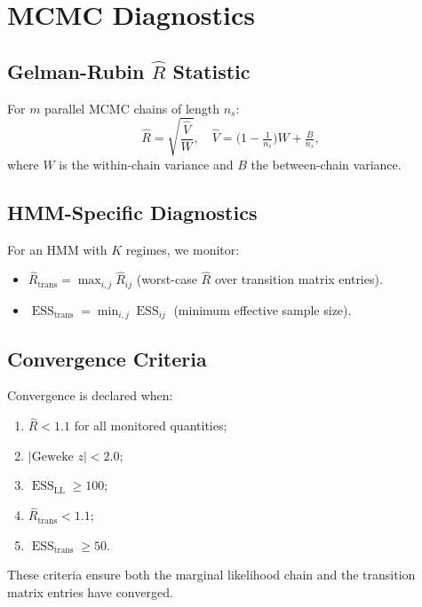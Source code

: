 \documentclass[11pt]{article}
\DeclareMathOperator{\ESS}{ESS}
\begin{document}
\section{MCMC Diagnostics}\label{app:mcmc}

\subsection{Gelman-Rubin $\hat{R}$ Statistic}

For $m$ parallel MCMC chains of length $n_s$:
\begin{equation}
  \hat{R} = \sqrt{\frac{\hat{V}}{W}}, \quad
  \hat{V} = \bigl(1 - \tfrac{1}{n_s}\bigr) W + \tfrac{B}{n_s},
\end{equation}
where $W$ is the within-chain variance and $B$ the between-chain
variance.

\subsection{HMM-Specific Diagnostics}

For an HMM with $K$ regimes, we monitor:
\begin{itemize}[nosep]
  \item $\hat{R}_{\mathrm{trans}} = \max_{i,j} \hat{R}_{ij}$
        (worst-case $\hat{R}$ over transition matrix entries).
  \item $\ESS_{\mathrm{trans}} = \min_{i,j} \ESS_{ij}$
        (minimum effective sample size).
\end{itemize}

\subsection{Convergence Criteria}

Convergence is declared when:
\begin{enumerate}[nosep]
  \item $\hat{R} < 1.1$ for all monitored quantities;
  \item $|\text{Geweke } z| < 2.0$;
  \item $\ESS_{\mathrm{LL}} \geq 100$;
  \item $\hat{R}_{\mathrm{trans}} < 1.1$;
  \item $\ESS_{\mathrm{trans}} \geq 50$.
\end{enumerate}
These criteria ensure both the marginal likelihood chain and the
transition matrix entries have converged.
\end{document}
